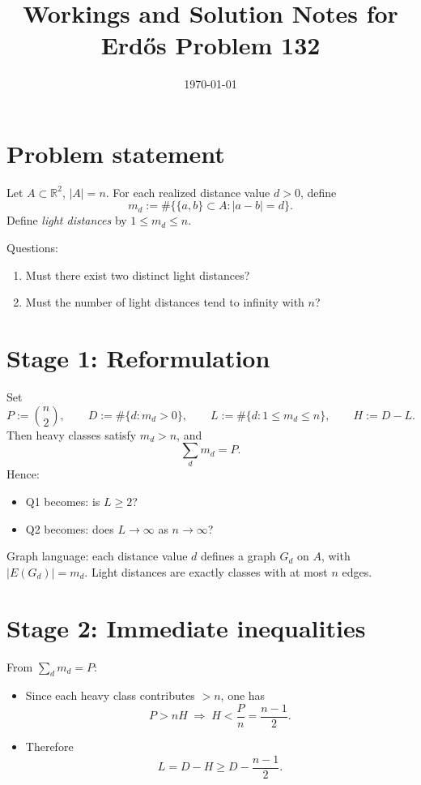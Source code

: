 \documentclass[11pt]{article}
\title{Workings and Solution Notes for Erd\H{o}s Problem 132}
\author{}
\date{\today}
\begin{document}
\maketitle

\section*{Problem statement}

Let \(A\subset \mathbb{R}^2\), \(|A|=n\). For each realized distance value \(d>0\), define
\[
m_d := \#\{\{a,b\}\subset A: |a-b|=d\}.
\]
Define \emph{light distances} by \(1\le m_d\le n\).

Questions:
\begin{enumerate}
  \item Must there exist two distinct light distances?
  \item Must the number of light distances tend to infinity with \(n\)?
\end{enumerate}

\section*{Stage 1: Reformulation}

Set
\[
P := \binom n2,\qquad D:=\#\{d:m_d>0\},\qquad
L:=\#\{d:1\le m_d\le n\},\qquad H:=D-L.
\]
Then heavy classes satisfy \(m_d>n\), and
\[
\sum_d m_d = P.
\]
Hence:
\begin{itemize}
  \item Q1 becomes: is \(L\ge 2\)?
  \item Q2 becomes: does \(L\to\infty\) as \(n\to\infty\)?
\end{itemize}

Graph language: each distance value \(d\) defines a graph \(G_d\) on \(A\), with \(|E(G_d)|=m_d\). Light distances are exactly classes with at most \(n\) edges.

\section*{Stage 2: Immediate inequalities}

From \(\sum_d m_d=P\):
\begin{itemize}
  \item Since each heavy class contributes \(>n\), one has
  \[
  P>nH\;\Rightarrow\; H<\frac{P}{n}=\frac{n-1}{2}.
  \]
  \item Therefore
  \[
  L=D-H\ge D-\frac{n-1}{2}.
  \]
\end{itemize}
\end{document}
